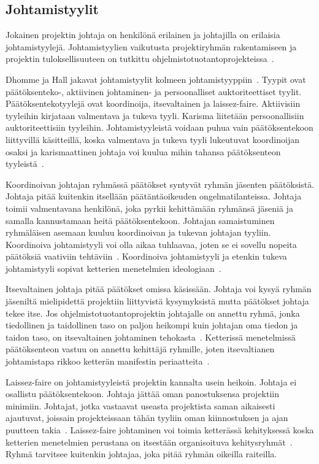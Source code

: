 \documentclass[finnish]{tktltiki2}
\theoremstyle{definition}
\theoremstyle{remark}
\begin{document}
\subsection{Johtamistyylit}

Jokainen projektin johtaja on henkilönä erilainen ja johtajilla on erilaisia johtamistyylejä. Johtamistyylien vaikutusta projektiryhmän rakentamiseen ja projektin tuloksellisuuteen on tutkittu ohjelmistotuotantoprojekteissa~\cite{Dhomne:2012:ITL:2382887.2382899}.

 Dhomme ja Hall jakavat johtamistyylit kolmeen johtamistyyppiin~\cite{Dhomne:2012:ITL:2382887.2382899}. Tyypit ovat päätöksenteko-, aktiivinen johtaminen- ja persoonalliset auktoriteettiset tyylit. Päätöksentekotyylejä ovat koordinoija, itsevaltainen ja laissez-faire. Aktiivisiin tyyleihin kirjataan valmentava ja tukeva tyyli. Karisma liitetään persoonallisiin auktoriteettisiin tyyleihin. Johtamistyyleistä voidaan puhua vain päätöksentekoon liittyvillä käsitteillä, koska valmentava ja tukeva tyyli lukeutuvat koordinoijan osaksi ja karismaattinen johtaja voi kuulua mihin tahansa päätöksenteon tyyleistä~\cite{Dhomne:2012:ITL:2382887.2382899}.

Koordinoivan johtajan ryhmässä päätökset syntyvät ryhmän jäsenten päätöksistä. Johtaja pitää kuitenkin itsellään päätäntäoikeuden ongelmatilanteissa. Johtaja toimii valmentavana henkilönä, joka pyrkii kehittämään ryhmänsä jäseniä ja samalla kannustamaan heitä päätöksentekoon. Johtajan samaistuminen ryhmäläisen asemaan kuuluu koordinoivan ja tukevan johtajan tyyliin. Koordinoiva johtamistyyli voi olla aikaa tuhlaavaa, joten se ei sovellu nopeita päätöksiä vaativiin tehtäviin~\cite{Dhomne:2012:ITL:2382887.2382899}. Koordinoiva johtamistyyli ja etenkin tukeva johtamistyyli sopivat ketterien menetelmien ideologiaan~\cite{fowler2001agile}.

Itsevaltainen johtaja pitää päätökset omissa käsissään. Johtaja voi kysyä ryhmän jäseniltä mielipidettä projektiin liittyvistä kysymyksistä mutta päätökset johtaja tekee itse. Jos ohjelmistotuotantoprojektin johtajalle on annettu ryhmä, jonka tiedollinen ja taidollinen taso on paljon heikompi kuin johtajan oma tiedon ja taidon taso, on itsevaltainen johtaminen tehokasta~\cite{Dhomne:2012:ITL:2382887.2382899}. Ketterissä menetelmissä päätöksenteon vastuu on annettu kehittäjä ryhmille, joten itsevaltianen johtamistapa rikkoo ketterän manifestin periaatteita~\cite{fowler2001agile}.

Laissez-faire on johtamistyyleistä projektin kannalta usein heikoin. Johtaja ei osallistu päätöksentekoon. Johtaja jättää oman panostuksensa projektiin minimiin. Johtajat, jotka vastaavat useasta projektista saman aikaisesti ajautuvat, joissain projekteissaan tähän tyyliin oman kiinnostuksen ja ajan puutteen takia~\cite{Dhomne:2012:ITL:2382887.2382899}. Laissez-faire johtaminen voi toimia ketterässä kehityksessä koska ketterien menetelmien perustana on itsestään organisoituva kehitysryhmät~\cite{fowler2001agile}. Ryhmä tarvitsee kuitenkin johtajaa, joka pitää ryhmän oikeilla raiteilla.
\end{document}
